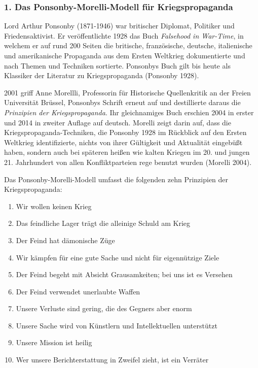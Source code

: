 \hypertarget{1-das-ponsonby-morelli-modell-fuxfcr-kriegspropaganda}{%
\subsubsection{1. Das Ponsonby-Morelli-Modell für
Kriegspropaganda}\label{1-das-ponsonby-morelli-modell-fuxfcr-kriegspropaganda}}

Lord Arthur Ponsonby (1871-1946) war britischer Diplomat, Politiker und
Friedensaktivist. Er veröffentlichte 1928 das Buch \emph{Falsehood in
War-Time}, in welchem er auf rund 200 Seiten die britische,
französische, deutsche, italienische und amerikanische Propaganda aus
dem Ersten Weltkrieg dokumentierte und nach Themen und Techniken
sortierte. Ponsonbys Buch gilt bis heute als Klassiker der Literatur zu
Kriegs­propaganda (Ponsonby 1928).

2001 griff Anne Morellli, Professorin für Historische Quellenkritik an
der Freien Universität Brüssel, Ponsonbys Schrift erneut auf und
destillierte daraus die \emph{Prinzipien der Kriegspropaganda}. Ihr
gleichnamiges Buch erschien 2004 in erster und 2014 in zweiter Auflage
auf deutsch. Morelli zeigt darin auf, dass die
Kriegspropaganda-Techniken, die Ponsonby 1928 im Rückblick auf den
Ersten Weltkrieg identifizierte, nichts von ihrer Gültigkeit und
Aktualität eingebüßt haben, sondern auch bei späteren heißen wie kalten
Kriegen im 20. und jungen 21. Jahrhundert von allen Konflikt­parteien
rege benutzt wurden (Morelli 2004).

Das Ponsonby-Morelli-Modell umfasst die folgenden zehn Prinzipien der
Kriegspropaganda:

\begin{enumerate}
\def\labelenumi{\arabic{enumi}.}
\tightlist
\item
  Wir wollen keinen Krieg
\item
  Das feindliche Lager trägt die alleinige Schuld am Krieg
\item
  Der Feind hat dämonische Züge
\item
  Wir kämpfen für eine gute Sache und nicht für eigennützige Ziele
\item
  Der Feind begeht mit Absicht Grausamkeiten; bei uns ist es Versehen
\item
  Der Feind verwendet unerlaubte Waffen
\item
  Unsere Verluste sind gering, die des Gegners aber enorm
\item
  Unsere Sache wird von Künstlern und Intellektuellen unterstützt
\item
  Unsere Mission ist heilig
\item
  Wer unsere Berichterstattung in Zweifel zieht, ist ein Verräter
\end{enumerate}

